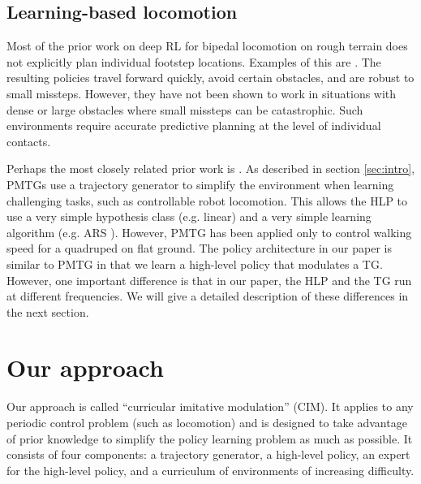 \documentclass[conference]{IEEEtran}
\newcommand{\nhatch}[1]{{\leavevmode\color{magenta} Nathan: #1}}
\begin{document}
\subsection{Learning-based locomotion}

Most of the prior work on deep RL for bipedal locomotion on rough terrain does not explicitly plan individual footstep locations.
Examples of this are \cite{peng2018deepmimic, heess2017emergence, peng2016terrain}. The resulting policies travel forward quickly, avoid certain obstacles, and are robust to small missteps.
However, they have not been shown to work in situations with dense or large obstacles where small missteps can be catastrophic.
Such environments require accurate predictive planning at the level of individual contacts.

Perhaps the most closely related prior work is \citet{iscen2018pmtg}.
As described in section \ref{sec:intro}, PMTGs use a trajectory generator to simplify the environment when learning challenging tasks, such as controllable robot locomotion.
This allows the HLP to use a very simple hypothesis class (e.g. linear) and a very simple learning algorithm (e.g. ARS \citep{mania2018simple}).
However, PMTG has been applied only to control walking speed for a quadruped on flat ground.
The policy architecture in our paper is similar to PMTG in that we learn a high-level policy that modulates a TG.
However, one important difference is that in our paper, the HLP and the TG run at different frequencies.
We will give a detailed description of these differences in the next section.


\section{Our approach} \label{sec:approach}

Our approach is called ``curricular imitative modulation'' (CIM).
It applies to any periodic control problem (such as locomotion) and is
designed to take advantage of prior knowledge to simplify the policy learning problem as much as possible.
It consists of four components: a trajectory generator, a high-level policy, an expert for the high-level policy, and a curriculum of environments of increasing difficulty.

\end{document}
